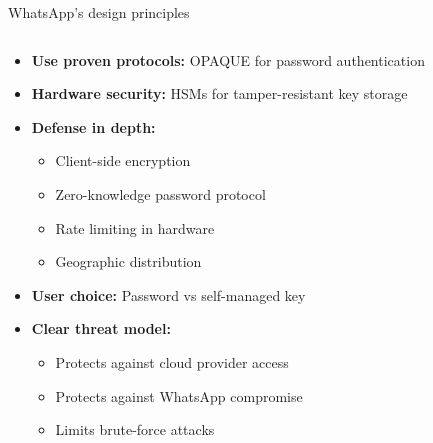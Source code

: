 \documentclass[aspectratio=169, lualatex, handout]{beamer}
\begin{document}
\begin{frame}{WhatsApp's design principles}
	\begin{columns}[c]
		\begin{column}{1\textwidth}
			\begin{itemize}
				\item \textbf{Use proven protocols:} OPAQUE for password authentication
				\item \textbf{Hardware security:} HSMs for tamper-resistant key storage
				\item \textbf{Defense in depth:}
				      \begin{itemize}
					      \item Client-side encryption
					      \item Zero-knowledge password protocol
					      \item Rate limiting in hardware
					      \item Geographic distribution
				      \end{itemize}
				\item \textbf{User choice:} Password vs self-managed key
				\item \textbf{Clear threat model:}
				      \begin{itemize}
					      \item Protects against cloud provider access
					      \item Protects against WhatsApp compromise
					      \item Limits brute-force attacks
				      \end{itemize}
			\end{itemize}
		\end{column}
	\end{columns}
\end{frame}
\end{document}
